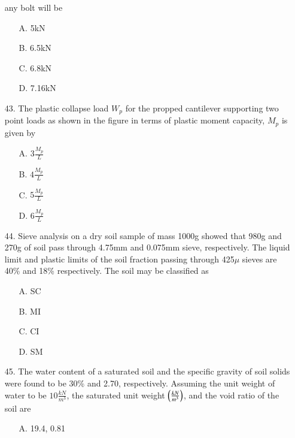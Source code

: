 \documentclass[journal]{IEEEtran}
\begin{document}
\begin{enumerate}
  any bolt will be 
  \begin{figure}[!ht]
    \centering
    \caption{ }
    \label{4 }
  \end{figure}
  \begin{enumerate}
    \item [A.] 5kN
    \item [B.] 6.5kN
    \item [C.] 6.8kN
    \item [D.] 7.16kN
  \end{enumerate}
  \item [43.] The plastic collapse load $W_p$ for the propped cantilever supporting two point loads
  as shown in the figure in terms of plastic moment capacity, $M_p$ is given by 
  \begin{figure}[!ht]
    \centering
    \caption{ }
    \label{5 }
  \end{figure}
  \begin{enumerate}
    \item [A.] $3\frac{M_p}{L}$
    \item [B.] $4\frac{M_p}{L}$
    \item [C.] $5\frac{M_p}{L}$
    \item [D.] $6\frac{M_p}{L}$
  \end{enumerate}
  \item [44.] Sieve analysis on a dry soil sample of mass 1000g showed that 980g and 270g of
  soil pass through 4.75mm and 0.075mm sieve, respectively. The liquid limit and
  plastic limits of the soil fraction passing through 425$\mu$ sieves are 40\% and 18\%
  respectively. The soil may be classified as 
  \begin{enumerate}
    \item [A.] SC
    \item [B.] MI
    \item [C.] CI
    \item [D.] SM
  \end{enumerate}
  \item[45.] The water content of a saturated soil and the specific gravity of soil solids were
  found to be 30\% and 2.70, respectively. Assuming the unit weight of water to be
  $10\frac{kN}{m^3}$, the saturated unit weight $\left(\frac{kN}{m^3}\right)$, and the void ratio of the soil are 
  \begin{enumerate}
    \item [A.] 19.4, 0.81

\end{enumerate}
\end{enumerate}
\end{document}
